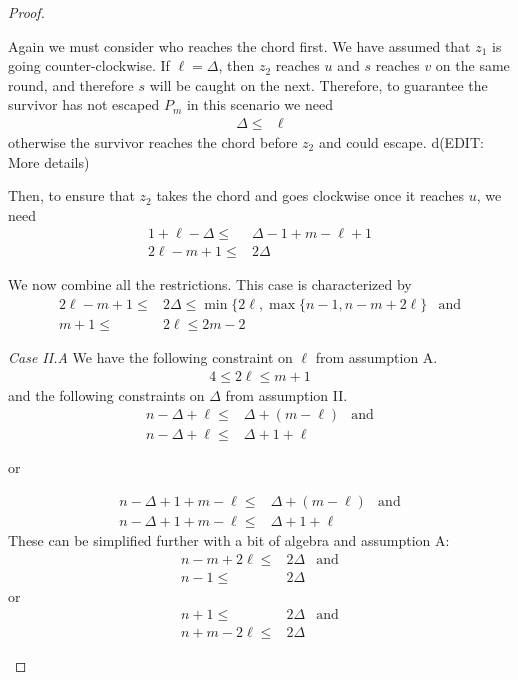 \documentclass[letterpaper, 10pt]{article}
\begin{document}
\begin{proof}
\begin{proofpart}
Again we must consider who reaches the chord first. We have assumed that $z_1$ is going counter-clockwise. If $\ell = \Delta$, then $z_2$ reaches $u$ and $s$ reaches $v$ on the same round, and therefore $s$ will be caught on the next. Therefore, to guarantee the survivor has not escaped $P_m$ in this scenario we need
\begin{align*}
  \Delta \leq & \ell
\end{align*}
otherwise the survivor reaches the chord before $z_2$ and
could escape. d(EDIT: More details)

Then, to ensure that $z_2$ takes the chord and goes clockwise once
it reaches $u$, we need
\begin{align*}
  1 + \ell - \Delta \leq & \Delta -1 + m - \ell + 1 \\
  2\ell - m + 1 \leq & 2 \Delta
\end{align*}

We now combine all the restrictions. This case is characterized by
\begin{align*}
  2\ell - m + 1 \leq & 2 \Delta \leq \min \{ 2\ell, \max \{ n-1, n-m+2\ell \} &\text{and}\\
m + 1 \leq & 2 \ell \leq 2m -2
\end{align*}

\textit{Case II.A} We have the following constraint on $\ell$ from
assumption A.
\begin{align*}
  4 \leq 2 \ell \leq m + 1
\end{align*}
and the following constraints on $\Delta$ from assumption II.
\begin{align*}
  n - \Delta + \ell \leq & \Delta + (m - \ell) & \text{and} \\
  n - \Delta + \ell \leq & \Delta + 1 + \ell
\end{align*}
\begin{center}or\end{center}
\begin{align*}
n - \Delta + 1 + m - \ell \leq & \Delta + (m - \ell) & \text{and} \\
 n - \Delta + 1 + m - \ell \leq & \Delta + 1 + \ell
\end{align*}
These can be simplified further with a bit of algebra and assumption A:
\begin{align*}
n-m +2\ell \leq & 2 \Delta & \text{and} \\
n-1 \leq & 2\Delta
\end{align*}
or
\begin{align*}
n + 1 \leq & 2 \Delta & \text{and} \\
n + m - 2\ell \leq & 2 \Delta
\end{align*}


\end{proofpart}
\end{proof}
\end{document}
